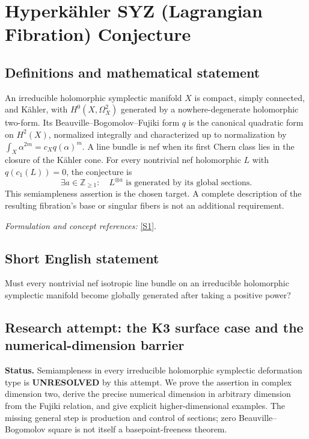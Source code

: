 \documentclass[11pt]{article}
\begin{document}
\section*{\texorpdfstring{Hyperkähler SYZ (Lagrangian Fibration) Conjecture}{Hyperkähler SYZ (Lagrangian Fibration) Conjecture}}\label{372}
\subsection{Definitions and mathematical statement}
An irreducible holomorphic symplectic manifold $X$ is compact, simply connected, and K\"ahler, with $H^0(X,\Omega_X^2)$ generated by a nowhere-degenerate holomorphic two-form. Its Beauville--Bogomolov--Fujiki form $q$ is the canonical quadratic form on $H^2(X)$, normalized integrally and characterized up to normalization by $\int_X\alpha^{2m}=c_Xq(\alpha)^m$. A line bundle is nef when its first Chern class lies in the closure of the K\"ahler cone. For every nontrivial nef holomorphic $L$ with $q(c_1(L))=0$, the conjecture is
\[
 \exists a\in{\mathbb{Z}}_{\ge1}:\quad L^{\otimes a}
 \text{ is generated by its global sections}.
\]
This semiampleness assertion is the chosen target. A complete description of the resulting fibration's base or singular fibers is not an additional requirement.
\par\smallskip\textit{Formulation and concept references:} \href{https://epiga.episciences.org/17061/pdf}{[S1]}.

\subsection{Short English statement}
Must every nontrivial nef isotropic line bundle on an irreducible holomorphic symplectic manifold become globally generated after taking a positive power?
\subsection{Research attempt: the K3 surface case and the numerical-dimension barrier}
\textbf{Status.} Semiampleness in every irreducible holomorphic symplectic deformation type is \textbf{UNRESOLVED} by this attempt. We prove the assertion in complex dimension two, derive the precise numerical dimension in arbitrary dimension from the Fujiki relation, and give explicit higher-dimensional examples. The missing general step is production and control of sections; zero Beauville--Bogomolov square is not itself a basepoint-freeness theorem.
\end{document}
